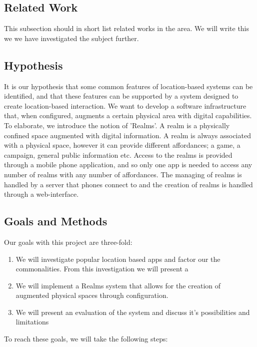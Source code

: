 \subsection{Related Work} %
\label{sub:background}
This subsection should in short list related works in the area. We will write this we we have investigated the subject further.


\subsection{Hypothesis} %
\label{sub:hypothesis}
It is our hypothesis that some common features of location-based systems can be identified, and that these features can be supported by a system designed to create location-based interaction. We want to develop a software infrastructure that, when configured, augments a certain physical area with digital capabilities. To elaborate, we introduce the notion of 'Realms'. A realm is a physically confined space augmented with digital information. A realm is always associated with a physical space, however it can provide different affordances; a game, a campaign, general public information etc. Access to the realms is provided through a mobile phone application, and so only one app is needed to access any number of realms with any number of affordances. The managing of realms is handled by a server that phones connect to and the creation of realms is handled through a web-interface. 

\subsection{Goals and Methods} %
\label{sub:goals_and_methods}
Our goals with this project are three-fold:

\begin{enumerate}
	\item We will investigate popular location based apps and factor our the commonalities. From this investigation we will present a 
	\item We will implement a Realms system that allows for the creation of augmented physical spaces through configuration. 
	\item We will present an evaluation of the system and discuss it's possibilities and limitations
\end{enumerate}

\noindent To reach these goals, we will take the following steps:


